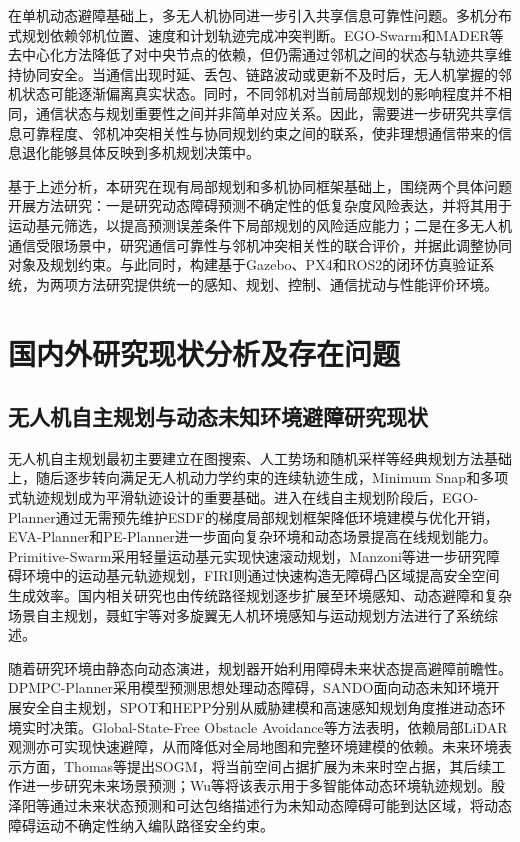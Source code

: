 在单机动态避障基础上，多无人机协同进一步引入共享信息可靠性问题。多机分布式规划依赖邻机位置、速度和计划轨迹完成冲突判断。EGO-Swarm\cite{egoSwarm}和MADER\cite{mader}等去中心化方法降低了对中央节点的依赖，但仍需通过邻机之间的状态与轨迹共享维持协同安全。当通信出现时延、丢包、链路波动或更新不及时后，无人机掌握的邻机状态可能逐渐偏离真实状态。同时，不同邻机对当前局部规划的影响程度并不相同，通信状态与规划重要性之间并非简单对应关系。因此，需要进一步研究共享信息可靠程度、邻机冲突相关性与协同规划约束之间的联系，使非理想通信带来的信息退化能够具体反映到多机规划决策中。

基于上述分析，本研究在现有局部规划和多机协同框架基础上，围绕两个具体问题开展方法研究：一是研究动态障碍预测不确定性的低复杂度风险表达，并将其用于运动基元筛选，以提高预测误差条件下局部规划的风险适应能力；二是在多无人机通信受限场景中，研究通信可靠性与邻机冲突相关性的联合评价，并据此调整协同对象及规划约束。与此同时，构建基于Gazebo、PX4和ROS2的闭环仿真验证系统，为两项方法研究提供统一的感知、规划、控制、通信扰动与性能评价环境。

\section{国内外研究现状分析及存在问题}

\subsection{无人机自主规划与动态未知环境避障研究现状}

无人机自主规划最初主要建立在图搜索、人工势场和随机采样等经典规划方法基础上\cite{dijkstra1959,hart1968astar,khatib1986apf,lavalle1998rrt}，随后逐步转向满足无人机动力学约束的连续轨迹生成，Minimum Snap\cite{mellinger2011minimumsnap}和多项式轨迹规划\cite{richter2016polynomial}成为平滑轨迹设计的重要基础。进入在线自主规划阶段后，EGO-Planner\cite{egoPlanner}通过无需预先维护ESDF的梯度局部规划框架降低环境建模与优化开销，EVA-Planner\cite{evaPlanner}和PE-Planner\cite{pePlanner}进一步面向复杂环境和动态场景提高在线规划能力。Primitive-Swarm\cite{primitiveSwarm}采用轻量运动基元实现快速滚动规划，Manzoni等\cite{manzoni2024primitives}进一步研究障碍环境中的运动基元轨迹规划，FIRI\cite{wang2025firi}则通过快速构造无障碍凸区域提高安全空间生成效率。国内相关研究也由传统路径规划逐步扩展至环境感知、动态避障和复杂场景自主规划，聂虹宇等\cite{nie2025review}对多旋翼无人机环境感知与运动规划方法进行了系统综述。

随着研究环境由静态向动态演进，规划器开始利用障碍未来状态提高避障前瞻性。DPMPC-Planner\cite{dpmpc}采用模型预测思想处理动态障碍，SANDO\cite{sando}面向动态未知环境开展安全自主规划，SPOT\cite{spot}和HEPP\cite{hepp}分别从威胁建模和高速感知规划角度推进动态环境实时决策。Global-State-Free Obstacle Avoidance\cite{zhang2025globalstatefree}等方法表明，依赖局部LiDAR观测亦可实现快速避障，从而降低对全局地图和完整环境建模的依赖。未来环境表示方面，Thomas等\cite{thomas2022sogm}提出SOGM，将当前空间占据扩展为未来时空占据，其后续工作\cite{thomas2023future}进一步研究未来场景预测；Wu等\cite{wu2024sogm}将该表示用于多智能体动态环境轨迹规划。殷泽阳等\cite{yin2025envelope}通过未来状态预测和可达包络描述行为未知动态障碍可能到达区域，将动态障碍运动不确定性纳入编队路径安全约束。

